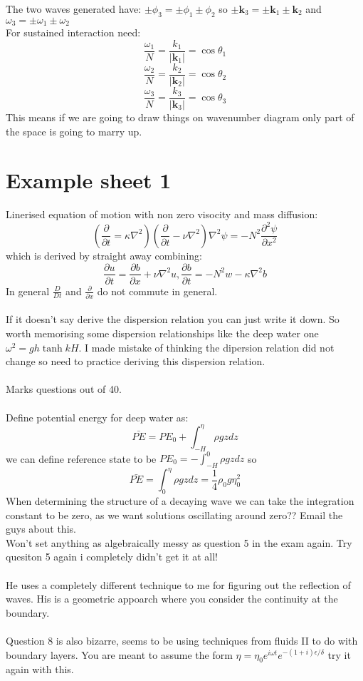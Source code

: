 \documentclass{article}
\begin{document}
The two waves generated have: $\pm \phi_3 = \pm \phi_1 \pm \phi_2$ so $\pm \bm k_3 = \pm \bm k_1 \pm \bm k_2$ and $\omega_3 = \pm \omega_1 \pm \omega_2$\\
For sustained interaction need:
$$
\frac{\omega_1}{N} = \frac{k_1}{|\bm k_1|} = \cos \theta_1
$$
$$
\frac{\omega_2}{N} = \frac{k_2}{|\bm k_2|} = \cos \theta_2
$$
$$
\frac{\omega_3}{N} = \frac{k_3}{|\bm k_3|} = \cos \theta_3
$$
This means if we are going to draw things on wavenumber diagram only part of the space is going to marry up.
\section{Example sheet 1}
Linerised equation of motion with non zero visocity and mass diffusion:
$$
( \frac{\partial}{\partial t} = \kappa \nabla^2) ( \frac{\partial }{\partial t} - \nu \nabla^2) \nabla^2 \psi = - N^2 \frac{\partial^2 \psi}{\partial x^2}
$$
which is derived by straight away combining:
$$
\frac{\partial u}{\partial t} = \frac{\partial b}{\partial x} + \nu \nabla^2 u, \frac{\partial b}{\partial t} = -N^2w - \kappa \nabla^2 b
$$
In general $\frac{D}{Dt}$ and $\frac{\partial }{\partial x}$ do not commute in general.\\\\
If it doesn't say derive the dispersion relation you can just write it down. So worth memorising some dispersion relationships like the deep water one $\omega^2 = gh \tanh k H$. I made mistake of thinking the dipersion relation did not change so need to practice deriving this dispersion relation.\\\\
Marks questions out of 40.\\\\
Define potential energy for deep water as:
$$
\bar{PE} = PE_0 + \int_{-H}^{\eta}  \rho g z dz
$$
we can define reference state to be $PE_0 = - \int_{-H}^0 \rho g z dz$ so
$$
\bar{PE} = \int_0^{\eta} \rho g z dz = \frac{1}{4} \rho_0 g \eta_0^2
$$
When determining the structure of a decaying wave we can take the integration constant to be zero, as we want solutions oscillating around zero?? Email the guys about this.\\
Won't set anything as algebraically messy as question 5 in the exam again. Try quesiton 5 again i completely didn't get it at all!\\\\
He uses a completely different technique to me for figuring out the reflection of waves. His is a geometric appoarch where you consider the continuity at the boundary.\\\\
Question 8 is also bizarre, seems to be using techniques from fluids II to do with boundary layers. You are meant to assume the form $\eta = \eta_0 e^{i\omega t} e^{- (1+i) \epsilon/ \delta}$ try it again with this.
\end{document}
